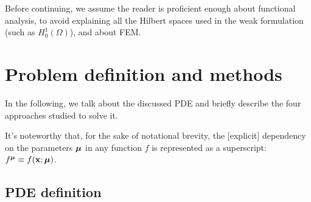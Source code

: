\documentclass[
    conference,
    nofonttune,
    11pt
]{IEEEtran}
\begin{document}
        Before continuing, we assume the reader is proficient enough about functional analysis, to avoid explaining all the Hilbert spaces used in the weak formulation (such as $H_0^1(\Omega)$), and about FEM.

    
    \section{Problem definition and methods}\label{secModelDef}
    
        In the following, we talk about the discussed PDE and briefly describe the four approaches studied to solve it.

        It's noteworthy that, for the sake of notational brevity, the [explicit] dependency on the parameters ${\boldsymbol\mu}$ in any function $f$ is represented as a superscript: $f^{\boldsymbol\mu}\equiv f(\mathbf x;{\boldsymbol\mu})$.

        \subsection{PDE definition}
\end{document}
